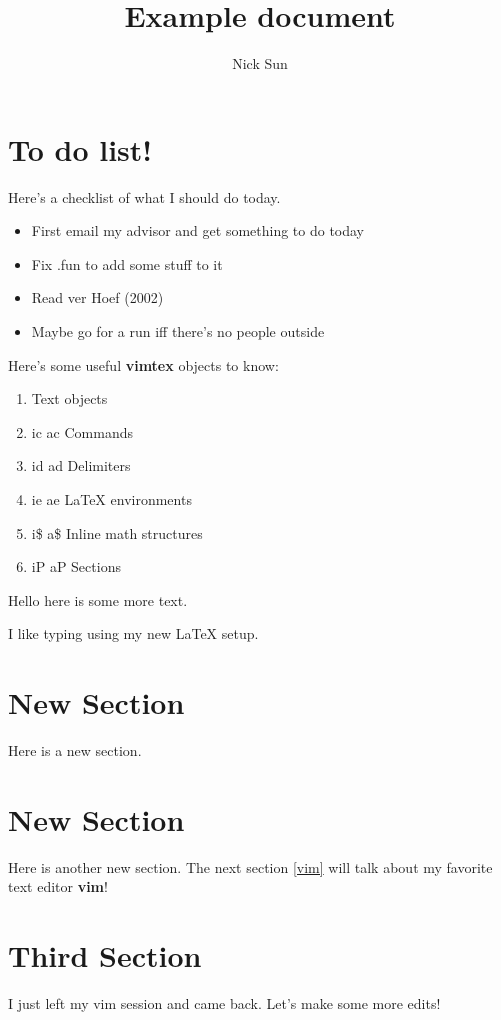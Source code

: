 \documentclass{article}
\title{Example document}
\author{Nick Sun}
\begin{document}
\maketitle

\section{To do list!}
Here's a checklist of what I should do today.

\begin{itemize}
	\item{First email my advisor and get something to do today}
	\item{Fix .fun to add some stuff to it}
	\item{Read ver Hoef (2002)}
	\item{Maybe go for a run iff there's no people outside}
\end{itemize}

Here's some useful \textbf{vimtex} objects to know:
\begin{enumerate}
	\item{Text objects}
	\item{ic ac Commands}
	\item{id ad Delimiters}
	\item{ie ae {\LaTeX} environments}
	\item{i\$ a\$ Inline math structures}
	\item{iP aP Sections}
\end{enumerate}

Hello here is some more text.

I like typing using my new {\LaTeX} setup.

\section{New Section}
	Here is a new section.

\section{New Section}
	Here is another new section.
	The next section \ref{vim} will talk about my favorite text editor \textbf{vim}!

\section{Third Section}
	I just left my vim\label{vim} session and came back.
	Let's make some more edits!
\end{document}
